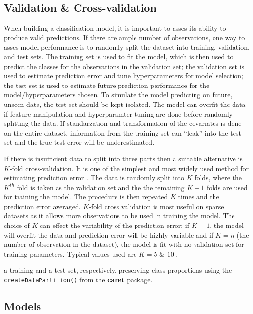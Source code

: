 \documentclass[12pt,]{article}
\begin{document}
\subsection{Validation \&
Cross-validation}\label{validation-cross-validation}

When building a classification model, it is important to asses its
ability to produce valid predictions. If there are ample number of
observations, one way to asses model performance is to randomly split
the dataset into training, validation, and test sets. The training set
is used to fit the model, which is then used to predict the classes for
the observations in the validation set; the validation set is used to
estimate prediction error and tune hyperparameters for model selection;
the test set is used to estimate future prediction performance for the
model/hyperparameters chosen. To simulate the model predicting on
future, unseen data, the test set should be kept isolated. The model can
overfit the data if feature manipulation and hyperparamter tuning are
done before randomly splitting the data. If standarzation and
transformation of the covariates is done on the entire dataset,
information from the training set can ``leak'' into the test set and the
true test error will be underestimated.

If there is insufficient data to split into three parts then a suitable
alternative is \(K\)-fold cross-validation. It is one of the simplest
and most widely used method for estimating prediction error
\citep{hastie_elements_2009}. The data is randomly split into \(K\)
folds, where the \(K^{th}\) fold is taken as the validation set and the
the remaining \(K-1\) folds are used for training the model. The
procedure is then repeated \(K\) times and the prediction error
averaged. \(K\)-fold cross validation is most useful on sparse datasets
as it allows more observations to be used in training the model. The
choice of \(K\) can effect the variability of the prediction error; if
\(K=1\), the model will overfit the data and prediction error will be
highly variable and if \(K=n\) (the number of observation in the
dataset), the model is fit with no validation set for training
parameters. Typical values used are \(K=5\) \& \(10\)
\citep{hastie_elements_2009}.

a training and a test set, respectively, preserving class proportions
using the \texttt{createDataPartition()} from the \textbf{caret}
package.

\subsection{Models}\label{models}
\end{document}
